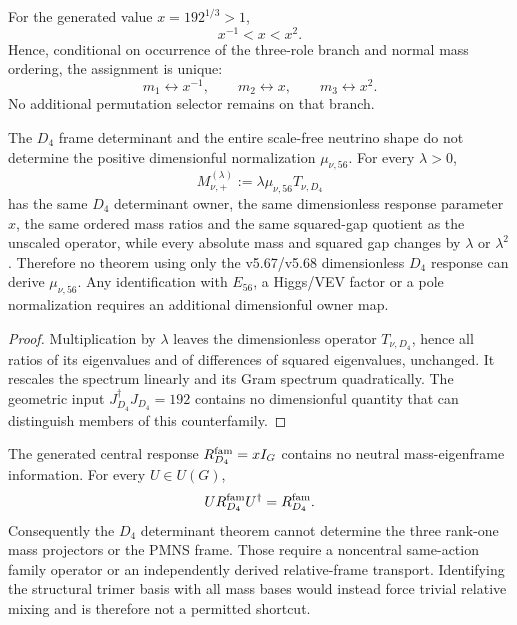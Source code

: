 \documentclass[12pt,a4paper]{article}
\begin{document}
\begin{corollary}
\label{p6:cor:v568-normal-order-role-assignment}
For the generated value \(x=192^{1/3}>1\),
\[
 \boxed{x^{-1}<x<x^2.}
\]
Hence, conditional on occurrence of the three-role branch and normal mass
ordering, the assignment is unique:
\[
 \boxed{m_1\leftrightarrow x^{-1},\qquad
        m_2\leftrightarrow x,\qquad
        m_3\leftrightarrow x^2.}
\]
No additional permutation selector remains on that branch.
\end{corollary}

\begin{proposition}
\label{p6:prop:v568-absolute-scale-counterfamily}
The \(D_4\) frame determinant and the entire scale-free neutrino shape do not
determine the positive dimensionful normalization \(\mu_{\nu,56}\).  For
every \(\lambda>0\),
\[
 M_{\nu,+}^{(\lambda)}
 :=\lambda\mu_{\nu,56}T_{\nu,D_4}
\]
has the same \(D_4\) determinant owner, the same dimensionless response
parameter \(x\), the same ordered mass ratios and the same squared-gap
quotient as the unscaled operator, while every absolute mass and squared gap
changes by \(\lambda\) or \(\lambda^2\).  Therefore no theorem using only the
v5.67/v5.68 dimensionless \(D_4\) response can derive
\(\mu_{\nu,56}\).  Any identification with \(E_{56}\), a Higgs/VEV factor or
a pole normalization requires an additional dimensionful owner map.
\end{proposition}

\begin{proof}
Multiplication by \(\lambda\) leaves the dimensionless operator
\(T_{\nu,D_4}\), hence all ratios of its eigenvalues and of differences of
squared eigenvalues, unchanged.  It rescales the spectrum linearly and its
Gram spectrum quadratically.  The geometric input \(J_{D_4}^\dagger
J_{D_4}=192\) contains no dimensionful quantity that can distinguish members
of this counterfamily.
\end{proof}

\begin{proposition}
\label{p6:prop:v568-central-response-eigenframe-nogo}
The generated central response \(R_{D_4}^{\rm fam}=xI_G\) contains no neutral
mass-eigenframe information.  For every \(U\in U(G)\),
\[
 UR_{D_4}^{\rm fam}U^\dagger=R_{D_4}^{\rm fam}.
\]
Consequently the \(D_4\) determinant theorem cannot determine the three
rank-one mass projectors or the PMNS frame.  Those require a noncentral
same-action family operator or an independently derived relative-frame
transport.  Identifying the structural trimer basis with all mass bases would
instead force trivial relative mixing and is therefore not a permitted
shortcut.
\end{proposition}
\end{document}

